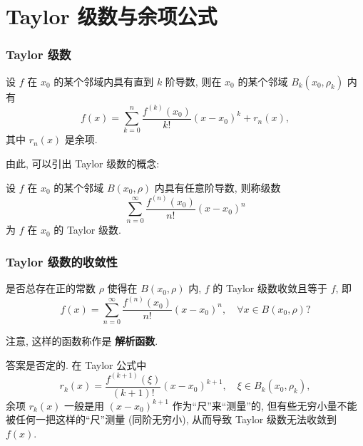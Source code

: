 
\section{Taylor 级数与余项公式}


\begin{frame}
\frametitle{Taylor 级数}

\begin{recall}[Taylor 公式]
设 $f$ 在 $x_0$ 的某个邻域内具有直到 $k$ 阶导数, 则在 $x_0$ 的某个邻域 $B_k(x_0, \rho_k)$ 内有
\[
f(x) = \sum_{k=0}^n \frac{f^{(k)}(x_0)}{k!} (x - x_0)^k + r_n(x),
\]
其中 $r_n(x)$ 是余项.
\end{recall}

由此, 可以引出 Taylor 级数的概念:

\pause
\vspace{0.5em}

\begin{Def}[Taylor 级数]
设 $f$ 在 $x_0$ 的某个邻域 $B(x_0, \rho)$ 内具有任意阶导数, 则称级数
\[
\sum_{n=0}^\infty \frac{f^{(n)}(x_0)}{n!} (x - x_0)^n
\]
为 $f$ 在 $x_0$ 的 Taylor 级数.
\end{Def}

\end{frame}


\begin{frame}
\frametitle{Taylor 级数的收敛性}

\begin{question}
是否总存在正的常数 $\rho$ 使得在 $B(x_0, \rho)$ 内, $f$ 的 Taylor 级数收敛且等于 $f$, 即
\[
f(x) = \sum_{n=0}^\infty \frac{f^{(n)}(x_0)}{n!} (x - x_0)^n, \quad \forall x \in B(x_0, \rho)?
\]
\end{question}

\alert{注意}, 这样的函数称作是 \textbf{解析函数}.

\pause
\vspace{0.5em}

\alert{答案是否定的}. 在 Taylor 公式中
\[
r_k(x) = \frac{f^{(k+1)}(\xi)}{(k+1)!} (x - x_0)^{k+1}, \quad \xi \in B_k(x_0, \rho_k),
\]
余项 $r_k(x)$ 一般是用 $(x - x_0)^{k+1}$ 作为``尺''来``测量''的, 但有些无穷小量不能被任何一把这样的``尺''测量 (同阶无穷小), 从而导致 Taylor 级数无法收敛到 $f(x)$.

\end{frame}

